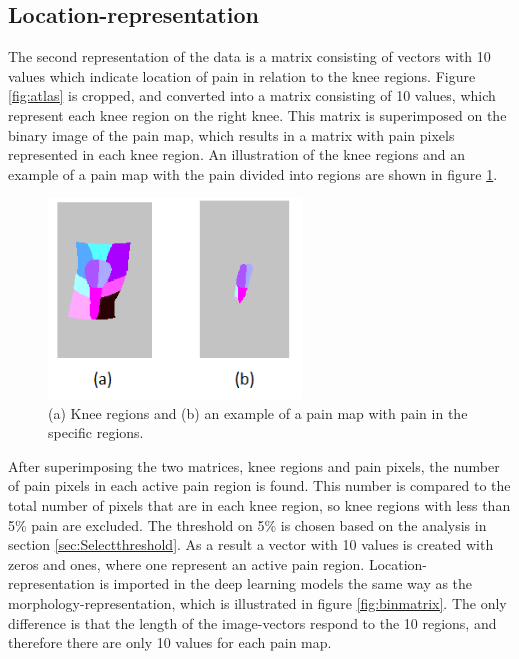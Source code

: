 \subsection{Location-representation} \label{sec:Regions}
The second representation of the data is a matrix consisting of vectors with 10 values which indicate location of pain in relation to the knee regions.
Figure \ref{fig:atlas} is cropped, and converted into a matrix consisting of 10 values, which represent each knee region on the right knee. This matrix is superimposed on the binary image of the pain map, which results in a matrix with pain pixels represented in each knee region. 
An illustration of the knee regions and an example of a pain map with the pain divided into regions are shown in figure \ref{fig:binregions}.

\begin{figure} [H]
\centering
\includegraphics[width=0.6\textwidth]{figures/binregions}
\caption{(a) Knee regions and (b) an example of a pain map with pain in the specific regions.}
\label{fig:binregions}
\end{figure}

\noindent
After superimposing the two matrices, knee regions and pain pixels, the number of pain pixels in each active pain region is found. This number is compared to the total number of pixels that are in each knee region, so knee regions with less than 5\% pain are excluded. The threshold on 5\% is chosen based on the analysis in section \ref{sec:Selectthreshold}. As a result a vector with 10 values is created with zeros and ones, where one represent an active pain region. Location-representation is imported in the deep learning models the same way as the morphology-representation, which is illustrated in figure \ref{fig:binmatrix}. The only difference is that the length of the image-vectors respond to the 10 regions, and therefore there are only 10 values for each pain map.


